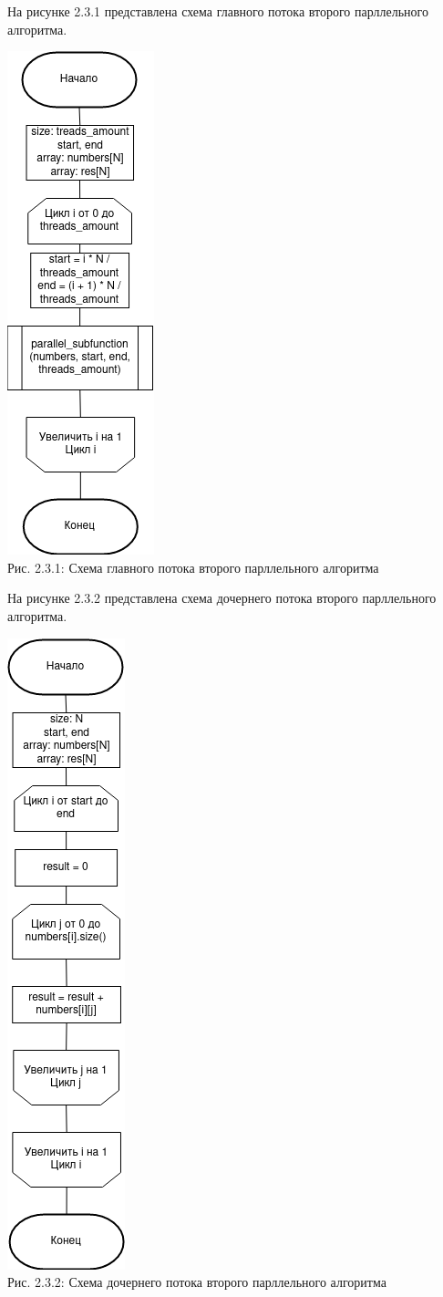 \documentclass[12pt,a4paper]{article}
\numberwithin{equation}{section}
\begin{document}
\clearpage
На рисунке 2.3.1 представлена схема главного потока второго парллельного алгоритма.\\
\begin{center}	
	\includegraphics[width=.26\linewidth]{src/schemas/parallel2_main.png}\\
	Рис. 2.3.1: Схема главного потока второго парллельного алгоритма
\end{center}
\clearpage
На рисунке 2.3.2 представлена схема дочернего потока второго парллельного алгоритма.\\
\begin{center}	
	\includegraphics[width=.2\linewidth]{src/schemas/parallel2_thread.png}\\
	Рис. 2.3.2: Схема дочернего потока второго парллельного алгоритма
\end{center}
\clearpage
{}
\end{document}
